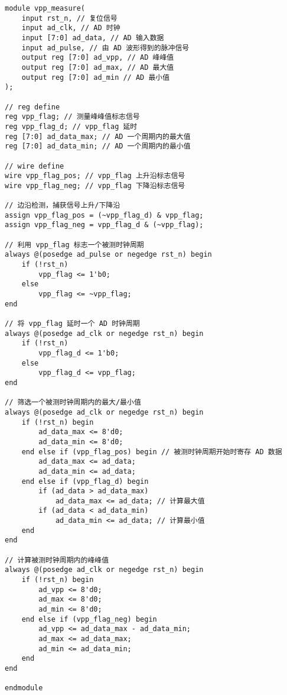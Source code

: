 \documentclass[lang=cn,a4paper,newtx]{elegantpaper}
\begin{document}
\begin{lstlisting}
module vpp_measure(
    input rst_n, // 复位信号
    input ad_clk, // AD 时钟
    input [7:0] ad_data, // AD 输入数据
    input ad_pulse, // 由 AD 波形得到的脉冲信号
    output reg [7:0] ad_vpp, // AD 峰峰值
    output reg [7:0] ad_max, // AD 最大值
    output reg [7:0] ad_min // AD 最小值
);

// reg define
reg vpp_flag; // 测量峰峰值标志信号
reg vpp_flag_d; // vpp_flag 延时
reg [7:0] ad_data_max; // AD 一个周期内的最大值
reg [7:0] ad_data_min; // AD 一个周期内的最小值

// wire define
wire vpp_flag_pos; // vpp_flag 上升沿标志信号
wire vpp_flag_neg; // vpp_flag 下降沿标志信号

// 边沿检测，捕获信号上升/下降沿
assign vpp_flag_pos = (~vpp_flag_d) & vpp_flag;
assign vpp_flag_neg = vpp_flag_d & (~vpp_flag);

// 利用 vpp_flag 标志一个被测时钟周期
always @(posedge ad_pulse or negedge rst_n) begin
    if (!rst_n)
        vpp_flag <= 1'b0;
    else
        vpp_flag <= ~vpp_flag;
end

// 将 vpp_flag 延时一个 AD 时钟周期
always @(posedge ad_clk or negedge rst_n) begin
    if (!rst_n)
        vpp_flag_d <= 1'b0;
    else
        vpp_flag_d <= vpp_flag;
end

// 筛选一个被测时钟周期内的最大/最小值
always @(posedge ad_clk or negedge rst_n) begin
    if (!rst_n) begin
        ad_data_max <= 8'd0;
        ad_data_min <= 8'd0;
    end else if (vpp_flag_pos) begin // 被测时钟周期开始时寄存 AD 数据
        ad_data_max <= ad_data;
        ad_data_min <= ad_data;
    end else if (vpp_flag_d) begin
        if (ad_data > ad_data_max)
            ad_data_max <= ad_data; // 计算最大值
        if (ad_data < ad_data_min)
            ad_data_min <= ad_data; // 计算最小值
    end
end

// 计算被测时钟周期内的峰峰值
always @(posedge ad_clk or negedge rst_n) begin
    if (!rst_n) begin
        ad_vpp <= 8'd0;
        ad_max <= 8'd0;
        ad_min <= 8'd0;
    end else if (vpp_flag_neg) begin
        ad_vpp <= ad_data_max - ad_data_min;
        ad_max <= ad_data_max;
        ad_min <= ad_data_min;
    end
end

endmodule

\end{lstlisting}
\end{document}
